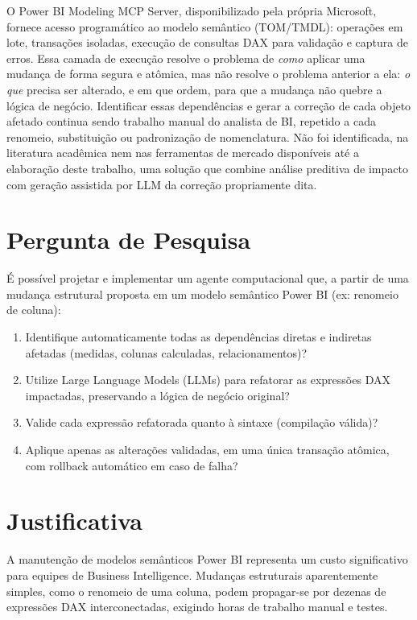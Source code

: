 \documentclass[
    12pt,               %
    openright,          %
    oneside,            %
    a4paper,            %
    chapter=TITLE,      %
    section=TITLE,      %
    brazil              %
]{abntex2}
\begin{document}
O Power BI Modeling MCP Server, disponibilizado pela própria Microsoft, fornece acesso programático ao modelo semântico (TOM/TMDL): operações em lote, transações isoladas, execução de consultas DAX para validação e captura de erros. Essa camada de execução resolve o problema de \textit{como} aplicar uma mudança de forma segura e atômica, mas não resolve o problema anterior a ela: \textit{o que} precisa ser alterado, e em que ordem, para que a mudança não quebre a lógica de negócio. Identificar essas dependências e gerar a correção de cada objeto afetado continua sendo trabalho manual do analista de BI, repetido a cada renomeio, substituição ou padronização de nomenclatura. Não foi identificada, na literatura acadêmica nem nas ferramentas de mercado disponíveis até a elaboração deste trabalho, uma solução que combine análise preditiva de impacto com geração assistida por LLM da correção propriamente dita.

\section{Pergunta de Pesquisa}

É possível projetar e implementar um agente computacional que, a partir de uma mudança estrutural proposta em um modelo semântico Power BI (ex: renomeio de coluna):

\begin{enumerate}
    \item Identifique automaticamente todas as dependências diretas e indiretas afetadas (medidas, colunas calculadas, relacionamentos)?
    \item Utilize Large Language Models (LLMs) para refatorar as expressões DAX impactadas, preservando a lógica de negócio original?
    \item Valide cada expressão refatorada quanto à sintaxe (compilação válida)?
    \item Aplique apenas as alterações validadas, em uma única transação atômica, com rollback automático em caso de falha?
\end{enumerate}

\section{Justificativa}

A manutenção de modelos semânticos Power BI representa um custo significativo para equipes de Business Intelligence. Mudanças estruturais aparentemente simples, como o renomeio de uma coluna, podem propagar-se por dezenas de expressões DAX interconectadas, exigindo horas de trabalho manual e testes.
\end{document}
